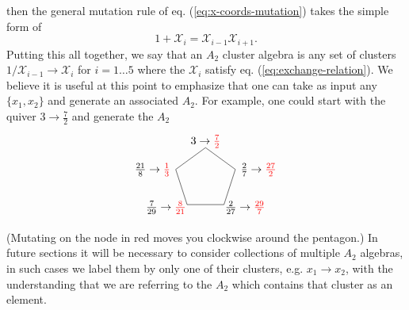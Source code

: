 \documentclass[11pt]{article}
\def\x{\mathcal{X}}
\def\drawPentagon{
\coordinate (P1) at (90:1);
\coordinate (P2) at (18:1);
\coordinate (P3) at (306:1);
\coordinate (P4) at (234:1);
\coordinate (P5) at (162:1);
\draw (P1) -- (P2) -- (P3) -- (P4) -- (P5) -- cycle;
}
\begin{document}
then the general mutation rule of eq. (\ref{eq:x-coords-mutation}) takes the simple form of
\begin{equation}\label{eq:exchange-relation}
  1+\x_i = \x_{i-1}\x_{i+1}.
\end{equation}
Putting this all together, we say that an $A_2$ cluster algebra is any set of clusters $1/\x_{i-1} \to \x_i$ for $i=1\ldots5$ where the $\x_i$ satisfy eq. (\ref{eq:exchange-relation}). We believe it is useful at this point to emphasize that one can take as input any $\{x_1, x_2\}$ and generate an associated $A_2$. For example, one could start with the quiver $3\to\frac{7}{2}$ and generate the $A_2$
\begin{equation}
\begin{tikzpicture}
  \drawPentagon
  \draw (0,1.2) node {$3\to\color{red}{\frac{7}{2}}$};
  \draw (1,.3) node[anchor=west] {$\frac{2}{7} \to \color{red}{\frac{27}{2}} $};
  \draw (.5,-.9) node[anchor=west] {$\frac{2}{27} \to \color{red}{\frac{29}{7}}$};
  \draw (-.5,-.9) node[anchor=east] {$\frac{7}{29} \to \color{red}{\frac{8}{21}}$};
  \draw (-1,.3) node[anchor=east] {$\frac{21}{8} \to \color{red}{\frac{1}{3}}$};
\end{tikzpicture}
\end{equation}
(Mutating on the node in red moves you clockwise around the pentagon.) In future sections it will be necessary to consider collections of multiple $A_2$ algebras, in such cases we label them by only one of their clusters, e.g. $x_1 \to x_2$, with the understanding that we are referring to the $A_2$ which contains that cluster as an element. 
\end{document}
